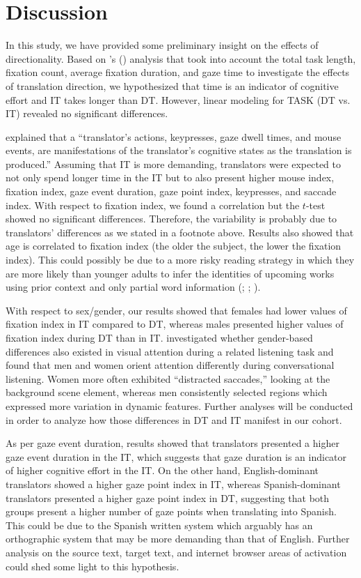 \documentclass[output=paper]{langscibook}
\begin{document}
\clearpage
\section{Discussion}
In this study, we have provided some preliminary insight on the effects of directionality. Based on \citeauthor{ferreira2016cognitive}’s (\citeyear{ferreira2016cognitive}) analysis that took into account the total task length, fixation count, average fixation duration, and gaze time to investigate the effects of translation direction, we hypothesized that time is an indicator of cognitive effort and IT takes longer than DT. However, linear modeling for TASK (DT vs. IT) revealed no significant differences.

\citet{carl2016computational} explained that a “translator’s actions, keypresses, gaze dwell times, and mouse events, are manifestations of the translator’s cognitive states as the translation is produced.” Assuming that IT is more demanding, translators were expected to not only spend longer time in the IT but to also present higher mouse index, fixation index, gaze event duration, gaze point index, keypresses, and saccade index. With respect to fixation index, we found a correlation but the $t$-test showed no significant differences. Therefore, the variability is probably due to translators’ differences as we stated in a footnote above. Results also showed that age is correlated to fixation index (the older the subject, the lower the fixation index). This could possibly be due to a more risky reading strategy in which they are more likely than younger adults to infer the identities of upcoming works using prior context and only partial word information (\citealt{rayner2009eye}; \citealt{rayner2013eye}; \citealt{wang2018adult}).

With respect to sex/gender, our results showed that females had lower values of fixation index in IT compared to DT, whereas males presented higher values of fixation index during DT than in IT. \citet{shen2012top} investigated whether gender-based differences also existed in visual attention during a related listening task and found that men and women orient attention differently during conversational listening. Women more often exhibited “distracted saccades,” looking at the background scene element, whereas men consistently selected regions which expressed more variation in dynamic features. Further analyses will be conducted in order to analyze how those differences in DT and IT manifest in our cohort. 

As per gaze event duration, results showed that translators presented a higher gaze event duration in the IT, which suggests that gaze duration is an indicator of higher cognitive effort in the IT. On the other hand, English-dominant translators showed a higher gaze point index in IT, whereas Spanish-dominant translators presented a higher gaze point index in DT, suggesting that both groups present a higher number of gaze points when translating into Spanish. This could be due to the Spanish written system which arguably has an orthographic system that may be more demanding than that of English. Further analysis on the source text, target text, and internet browser areas of activation could shed some light to this hypothesis. 
\end{document}
